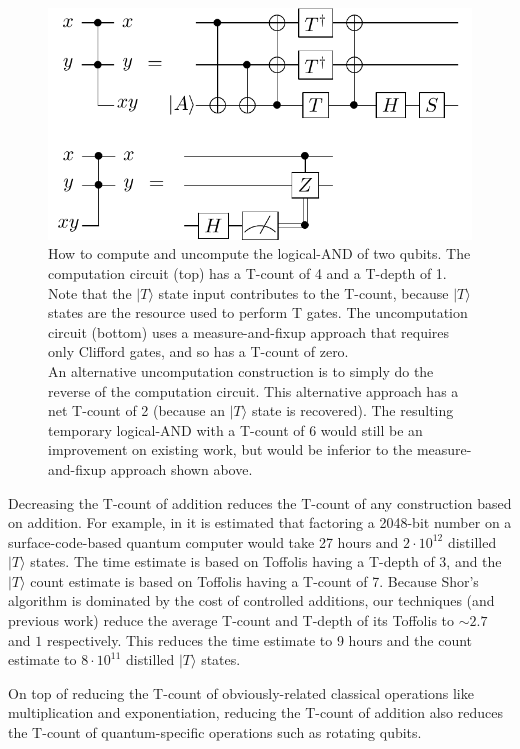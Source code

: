 \documentclass[twocolumn]{quantumarticle-customized}
\begin{document}
\begin{figure}
  \includegraphics[width=\linewidth]{temporary-logical-and.pdf}
  \caption{
	How to compute and uncompute the logical-AND of two qubits.
	The computation circuit (top) has a T-count of 4 and a T-depth of 1.
	Note that the $|T\rangle$ state input contributes to the T-count, because $|T\rangle$ states are the resource used to perform T gates.
	The uncomputation circuit (bottom) uses a measure-and-fixup approach \cite{Jones2013} that requires only Clifford gates, and so has a T-count of zero.
    \\
    An alternative uncomputation construction is to simply do the reverse of the computation circuit.
    This alternative approach has a net T-count of 2 (because an $|T\rangle$ state is recovered).
    The resulting temporary logical-AND with a T-count of 6 would still be an improvement on existing work, but would be inferior to the measure-and-fixup approach shown above.
  }
  \label{fig:temporary-logical-AND}
\end{figure}

Decreasing the T-count of addition reduces the T-count of any construction based on addition.
For example, in \cite{Fowler2012} it is estimated that factoring a 2048-bit number on a surface-code-based quantum computer would take 27 hours and $2 \cdot 10^{12}$ distilled $|T\rangle$ states.
The time estimate is based on Toffolis having a T-depth of 3, and the $|T\rangle$ count estimate is based on Toffolis having a T-count of 7.
Because Shor's algorithm is dominated by the cost of controlled additions, our techniques (and previous work) reduce the average T-count and T-depth of its Toffolis to $\sim 2.7$ and $1$ respectively.
This reduces the time estimate to 9 hours and the count estimate to $8 \cdot 10^{11}$ distilled $|T\rangle$ states.

On top of reducing the T-count of obviously-related classical operations like multiplication and exponentiation, reducing the T-count of addition also reduces the T-count of quantum-specific operations such as rotating qubits.
\end{document}
